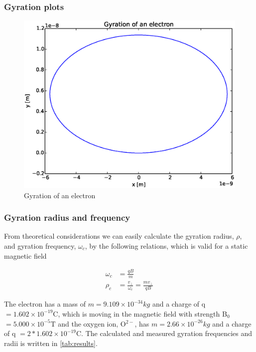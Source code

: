 \documentclass[x11names]{article}
\begin{document}
      \subsubsection{Gyration plots}
            \begin{figure}
                  \includegraphics[width = \linewidth]{../source/electronGyration}
                  \caption{Gyration of an electron}
            \end{figure}

      \subsubsection{Gyration radius and frequency}
            From theoretical considerations we can easily calculate the gyration radius, \(\rho\), and gyration frequency, \( \omega_c \), by the following relations, which is valid for a static magnetic field

            \begin{align}
                  \omega_c    &= \frac{qB}{m} \\
                  \rho_c      &= \frac{v_\perp}{\omega_c} = \frac{mv_\perp}{qB}
            \end{align}

            The electron has a mass of \(m = 9.109 \times 10^{-34} \si{kg}\) and a charge of q \( = 1.602\times 10^{-19} \si{\coulomb} \), which is moving in the magnetic field with strength B\(_0\) \( = 5.000 \times 10^ {-5} \si{\tesla}\) and the oxygen ion,  O\(^{2-}\), has \(m = 2.66 \times 10^{-26} \si{kg}\) and a charge of q \( = 2*1.602\times 10^{-19} \si{\coulomb} \). The calculated and measured gyration frequencies and radii is written in \cref{tab:results}.
\end{document}
